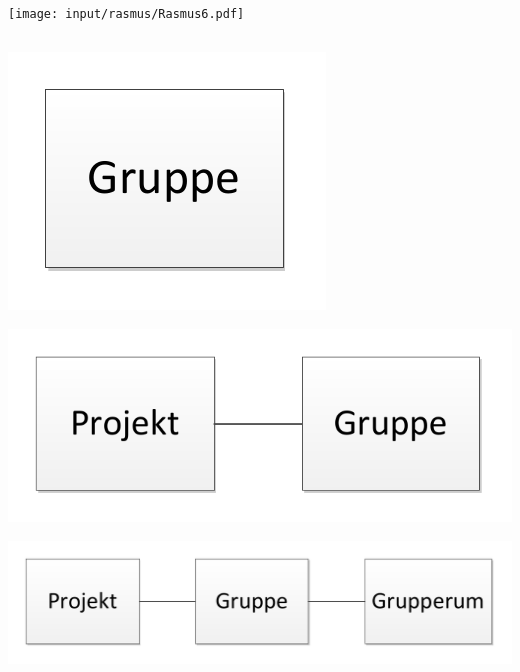 \begin{frame}{\topicone} 
\texttt{[image: input/rasmus/Rasmus6.pdf]}
\end{frame}




\subsection*{\topictwo}

\begin{frame}{\topictwo} 
\includegraphics[width=\columnwidth]{input/rasmus/topictwo1.pdf}
\end{frame}
\begin{frame}{\topictwo} 
\includegraphics[width=\columnwidth]{input/rasmus/topictwo2.pdf}
\end{frame}
\begin{frame}{\topictwo} 
\includegraphics[width=\columnwidth]{input/rasmus/topictwo3.pdf}
\end{frame}
